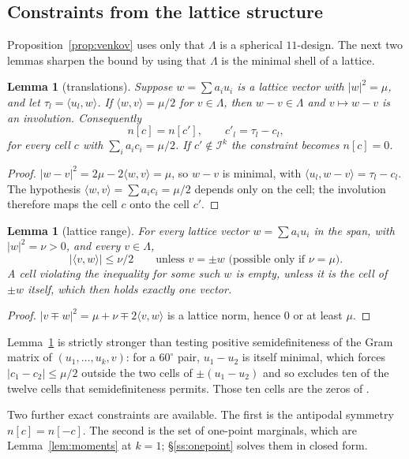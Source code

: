 \documentclass[11pt]{amsart}
\newtheorem{lemma}[theorem]{Lemma}
\theoremstyle{remark}
\newcommand{\ip}[2]{\langle #1,#2\rangle}
\begin{document}
\subsection{Constraints from the lattice structure}

Proposition~\ref{prop:venkov} uses only that $\Lambda$ is a spherical
$11$-design. The next two lemmas sharpen the bound by using that $\Lambda$ is the
minimal shell of a lattice.

\begin{lemma}[translations]\label{lem:trans}
Suppose $w=\sum a_iu_i$ is a lattice vector with $|w|^2=\mu$, and let
$\tau_l=\ip{u_l}{w}$. If $\ip{w}{v}=\mu/2$ for $v\in\Lambda$, then
$w-v\in\Lambda$ and $v\mapsto w-v$ is an involution. Consequently
\[
  n[c]=n[c'], \qquad c'_l=\tau_l-c_l ,
\]
for every cell $c$ with $\sum_i a_ic_i=\mu/2$. If $c'\notin\mathcal I^k$ the constraint
becomes $n[c]=0$.
\end{lemma}

\begin{proof}
$|w-v|^2=2\mu-2\ip{w}{v}=\mu$, so $w-v$ is minimal, with
$\ip{u_l}{w-v}=\tau_l-c_l$. The hypothesis $\ip{w}{v}=\sum a_ic_i=\mu/2$ depends
only on the cell; the involution therefore maps the cell $c$ onto the cell $c'$.
\end{proof}

\begin{lemma}[lattice range]\label{lem:range}
For every lattice vector $w=\sum a_iu_i$ in the span, with $|w|^2=\nu>0$, and
every $v\in\Lambda$,
\[
  |\ip{v}{w}|\le \nu/2 \qquad\text{unless } v=\pm w \text{ (possible only if }\nu=\mu).
\]
A cell violating the inequality for some such $w$ is empty, unless it is the
cell of $\pm w$ itself, which then holds exactly one vector.
\end{lemma}

\begin{proof}
$|v\mp w|^2=\mu+\nu\mp2\ip{v}{w}$ is a lattice norm, hence $0$ or at least
$\mu$.
\end{proof}

Lemma~\ref{lem:range} is strictly stronger than testing positive
semidefiniteness of the Gram matrix of $(u_1,\dots,u_k,v)$: for a $60^\circ$
pair, $u_1-u_2$ is itself minimal, which forces $|c_1-c_2|\le\mu/2$ outside the two
cells of $\pm(u_1-u_2)$ and so excludes ten of the twelve cells that
semidefiniteness permits. Those ten cells are the zeros of
\cite[Lemma 4.2]{ozeki2016}.

Two further exact constraints are available. The first is the antipodal
symmetry $n[c]=n[-c]$. The second is the set of one-point marginals, which are
Lemma~\ref{lem:moments} at $k=1$; \S\ref{ss:onepoint} solves them in closed form.
\end{document}
